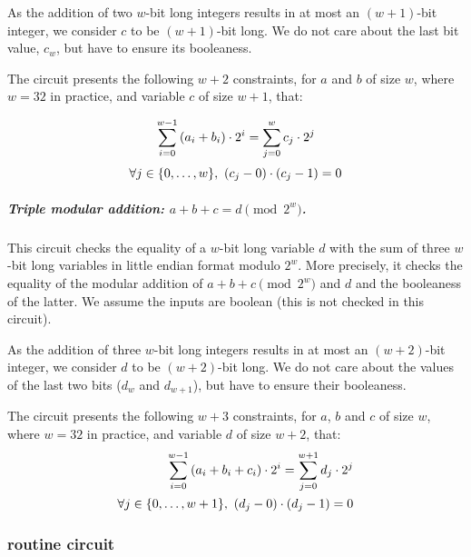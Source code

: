 As the addition of two $w$-bit long integers results in at most an $(w + 1)$-bit integer, we consider $c$ to be $(w + 1)$-bit long. We do not care about the last bit value, $c_w$, but have to ensure its booleaness.

The circuit presents the following $w+2$ constraints, for $a$ and $b$ of size $w$, where $w=32$ in practice, and variable $c$ of size $w+1$, that:

\begin{equation}
  \label{implementation:eq:modular_sum}
  \sum_{i=0}^{w - 1} \left( a_i + b_i \right ) \cdot 2^i = \sum_{j=0}^{w} c_j \cdot 2^j\\
\end{equation}
\begin{equation}
  \label{implementation:eq:modular_bool}
  \forall j \in \{{0},\ldots,{w}\},\ (c_j - 0) \cdot (c_j - 1) = 0
\end{equation}

\subparagraph{Triple modular addition: {\boldmath $a + b + c = d \pmod {2^w}$}.}

This circuit checks the equality of a $w$-bit long variable $d$ with the sum of three $w$-bit long variables in little endian format modulo ${2^w}$. More precisely, it checks the equality of the modular addition of $a+b+c \pmod {2^w}$ and $d$ and the booleaness of the latter. We assume the inputs are boolean (this is not checked in this circuit).

As the addition of three $w$-bit long integers results in at most an $(w + 2)$-bit integer, we consider $d$ to be $(w + 2)$-bit long. We do not care about the values of the last two bits ($d_w$ and $d_{w+1}$), but have to ensure their booleaness.

The circuit presents the following $w+3$ constraints, for $a$, $b$ and $c$ of size $w$, where $w=32$ in practice, and variable $d$ of size $w+2$, that:
\begin{align}
  \sum_{i=0}^{w - 1} \left( a_i + b_i + c_i \right ) \cdot 2^i = \sum_{j=0}^{w+1} d_j \cdot 2^j \label{implementation:eq:triple_modular_sum} \\
  \forall j \in \{{0},\ldots,{w + 1}\},\ (d_j - 0) \cdot (d_j - 1) = 0 \label{implementation:eq:triple_modular_bool}
\end{align}

\subsubsection{ routine circuit}\label{implementation:efficiency:blake:g-circuit}

